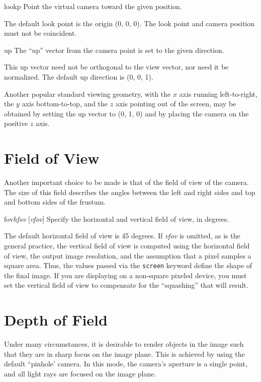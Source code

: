\begin{defkey}{lookp}{}
	Point the virtual camera toward the given position.
\end{defkey}
The default look point is the origin (0, 0, 0).  The look point
and camera position must not be coincident.

\begin{defkey}{up}{}
	The ``up'' vector from the camera point is set to the
	given direction.
\end{defkey}
This up vector need not be orthogonal to
the view vector, nor need it be normalized.  The default up
direction is (0, 0, 1).

Another popular standard viewing geometry, with the $x$ axis running
left-to-right,
the $y$ axis bottom-to-top, and the $z$ axis pointing out of the screen,
may be obtained by setting the up vector to (0, 1, 0) and by placing
the camera on the positive $z$ axis.

\section{Field of View}

Another important choice to be made is that of the 
field of view of the camera.  The size of this field describes
the angles between the left and right sides and top and bottom sides
of the frustum.

\begin{defkey}{fov}{{\em hfov} [{\em vfov}]}
	Specify
	the horizontal and vertical field of view, in degrees.
\end{defkey}
The default horizontal field of view is 45 degrees.
If {\em vfov} is omitted, as is the general practice,
the vertical field of view is computed using the horizontal
field of view, the output image resolution, and the assumption
that a pixel samples a square area.  Thus,
the values passed via the
{\tt screen} keyword define the shape of the final image.
If you are
displaying on a non-square pixeled device,
you must set the vertical field of view
to compensate for the ``squashing'' that will result.

\section{Depth of Field}

Under many circumstances,
it is desirable to render
objects in the image such that they are in sharp
focus on the image plane.  This is achieved by using the default
``pinhole' camera.  In this mode, the camera's aperture is a single
point, and all light rays are focused on the image plane.

